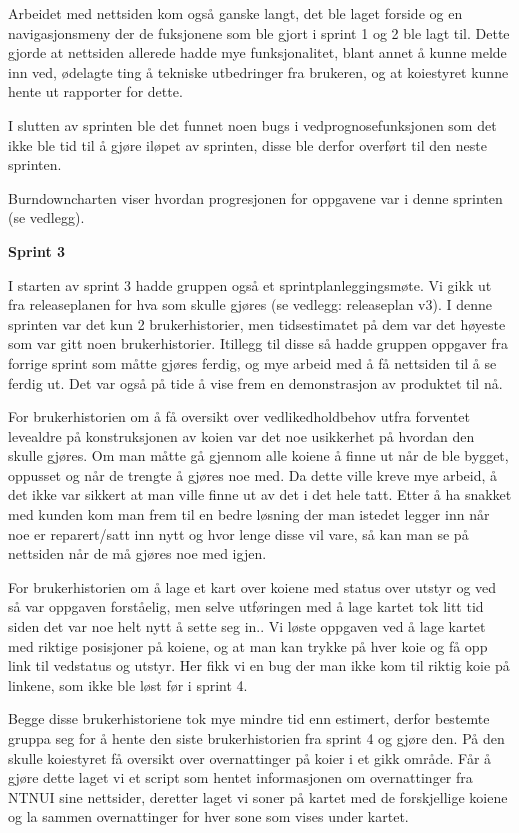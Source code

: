 \documentclass[12pt,a4paper,norsk]{article}
\begin{document}
Arbeidet med nettsiden kom også ganske langt, det ble laget forside og en navigasjonsmeny der de fuksjonene som ble gjort i sprint 1 og 2 ble lagt til. Dette gjorde at nettsiden allerede hadde mye funksjonalitet, blant annet å kunne melde inn ved, ødelagte ting å tekniske utbedringer fra brukeren, og at koiestyret kunne hente ut rapporter for dette. 

I slutten av sprinten ble det funnet noen bugs i vedprognosefunksjonen som det ikke ble tid til å gjøre iløpet av sprinten, disse ble derfor overført til den neste sprinten.

Burndowncharten viser hvordan progresjonen for oppgavene var i denne sprinten (se vedlegg).

\bigskip \noindent \textbf{Sprint 3}
\par I starten av sprint 3 hadde gruppen også et sprintplanleggingsmøte. Vi gikk ut fra releaseplanen for hva som skulle gjøres (se vedlegg: releaseplan v3). I denne sprinten var det kun 2 brukerhistorier, men tidsestimatet på dem var det høyeste som var gitt noen brukerhistorier. Itillegg til disse så hadde gruppen oppgaver fra forrige sprint som måtte gjøres ferdig, og mye arbeid med å få nettsiden til å se ferdig ut. Det var også på tide å vise frem en demonstrasjon av produktet til nå. 

For brukerhistorien om å få oversikt over vedlikedholdbehov utfra forventet levealdre på konstruksjonen av koien var det noe usikkerhet på hvordan den skulle gjøres. Om man måtte gå gjennom alle koiene å finne ut når de ble bygget, oppusset og når de trengte å gjøres noe med. Da dette ville kreve mye arbeid, å det ikke var sikkert at man ville finne ut av det i det hele tatt. Etter å ha snakket med kunden kom man frem til en bedre løsning der man istedet legger inn når noe er reparert/satt inn nytt og hvor lenge disse vil vare, så kan man se på nettsiden når de må gjøres noe med igjen. 

For brukerhistorien om å lage et kart over koiene med status over utstyr og ved så var oppgaven forståelig, men selve utføringen med å lage kartet tok litt tid siden det var noe helt nytt å sette seg in.. Vi løste oppgaven ved å lage kartet med riktige posisjoner på koiene, og at man kan trykke på hver koie og få opp link til vedstatus og utstyr. Her fikk vi en bug der man ikke kom til riktig koie på linkene, som ikke ble løst før i sprint 4.   

Begge disse brukerhistoriene tok mye mindre tid enn estimert, derfor bestemte gruppa seg for å hente den siste brukerhistorien fra sprint 4 og gjøre den. På den skulle koiestyret få oversikt over overnattinger på koier i et gikk område. Får å gjøre dette laget vi et script som hentet informasjonen om overnattinger fra NTNUI sine nettsider, deretter laget vi soner på kartet med de forskjellige koiene og la sammen overnattinger for hver sone som vises under kartet. 
\end{document}
